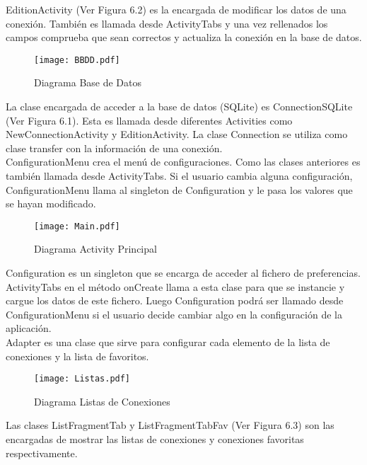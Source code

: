 EditionActivity (Ver Figura 6.2) es la encargada de modificar los datos de una conexión. También es llamada desde ActivityTabs y una vez rellenados los campos comprueba que sean correctos y actualiza la conexión en la base de datos.

\begin{figure}[h]
\begin{center}
\texttt{[image: BBDD.pdf]}
\end{center}
\caption{Diagrama Base de Datos}
\end{figure}

La clase encargada de acceder a la base de datos (SQLite) es ConnectionSQLite (Ver Figura 6.1). Esta es llamada desde diferentes Activities como NewConnectionActivity y EditionActivity. La clase Connection se utiliza como clase transfer con la información de una conexión.\\

ConfigurationMenu crea el menú de configuraciones. Como las clases anteriores es también llamada desde ActivityTabs. Si el usuario cambia alguna configuración, ConfigurationMenu llama al singleton de Configuration y le pasa los valores que se hayan modificado.

\begin{figure}[h]
\begin{center}
\texttt{[image: Main.pdf]}
\end{center}
\caption{Diagrama Activity Principal}
\end{figure}

Configuration es un singleton que se encarga de acceder al fichero de preferencias. ActivityTabs en el método onCreate llama a esta clase para que se instancie y cargue los datos de este fichero. Luego Configuration podrá ser llamado desde ConfigurationMenu si el usuario decide cambiar algo en la configuración de la aplicación.\\

Adapter es una clase que sirve para configurar cada elemento de la lista de conexiones y la lista de favoritos.\\

\begin{figure}[h]
\begin{center}
\texttt{[image: Listas.pdf]}
\end{center}
\caption{Diagrama Listas de Conexiones}
\end{figure}

Las clases ListFragmentTab y ListFragmentTabFav (Ver Figura 6.3) son las encargadas de mostrar las listas de conexiones y conexiones favoritas respectivamente.\\

